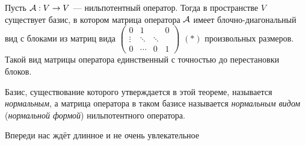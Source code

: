 \begin{theorem}
    Пусть $\mathcal{A}: V \to V$ --- нильпотентный оператор. Тогда в пространстве $V$ существует базис, в котором матрица оператора $\mathcal{A}$ имеет блочно-диагональный вид с блоками из матриц вида
    $
    \begin{pmatrix}
        0 & 1 & & 0\\
        \vdots & \ddots & \ddots & \\
        0 & \cdots & 0 & 1
    \end{pmatrix}
    $ $(\ast)$ произвольных размеров. Такой вид матрицы оператора единственный с точностью до перестановки блоков.
\end{theorem}

\begin{definition}
    Базис, существование которого утверждается в этой теореме, называется \textit{нормальным}, а матрица оператора в таком базисе называется \textit{нормальным видом} (\textit{нормальной формой}) нильпотентного оператора.
\end{definition}

Впереди нас ждёт длинное и не очень увлекательное

